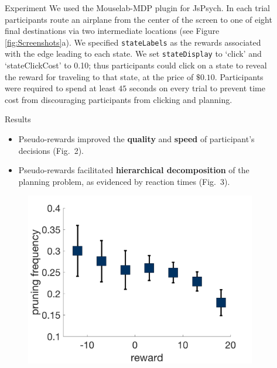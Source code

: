 \documentclass[final]{beamer}
\newlength{\sepwid}
\newlength{\onecolwid}
\newlength{\twocolwid}
\begin{document}
\begin{frame}[t]
\begin{columns}[t]
\begin{column}{\twocolwid}
\end{column} %
\begin{column}{\sepwid}\end{column} %
\begin{column}{\onecolwid} %

  \begin{block}{Experiment}\label{experiment}
    We used the Mouselab-MDP plugin for JsPsych. In each trial participants route an airplane from the center of the screen to one of eight final destinations via two intermediate locations (see Figure \ref{fig:Screenshots}a). We specified \texttt{stateLabels} as the rewards associated with the edge leading to each state. We set \texttt{stateDisplay} to `click' and `stateClickCost' to 0.10; thus participants could click on a state to reveal the reward for traveling to that state, at the price of $\$0.10$. Participants were required to spend at least $45$ seconds on every trial to prevent time cost from discouraging participants from clicking and planning.
  \end{block}

  \begin{alertblock}{Results}\label{results}
    \begin{itemize}
      \item Pseudo-rewards improved the \textbf{quality} and \textbf{speed} of participant's decisions (Fig.~2).
      \item Pseudo-rewards facilitated \textbf{hierarchical decomposition} of the planning problem, as evidenced by reaction times (Fig.~3).
    \end{itemize}
  \end{alertblock}

  \begin{figure}
    \includegraphics[width=0.9\linewidth]{figs/prunning_any_noFB.png}
  \end{figure}


\end{column}
\end{columns}
\end{frame}
\end{document}
